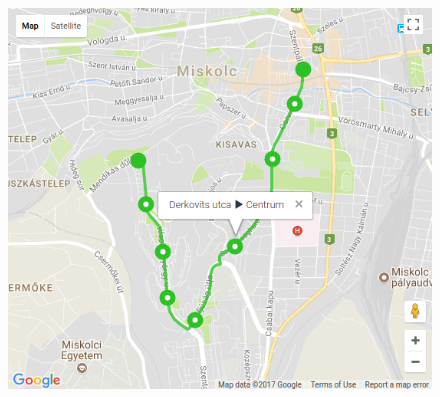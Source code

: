 \begin{figure}[h!]
\centering
\includegraphics[scale=0.7]{kepek/terkep.png}
\caption{}
\label{fig:terkep}
\end{figure}
